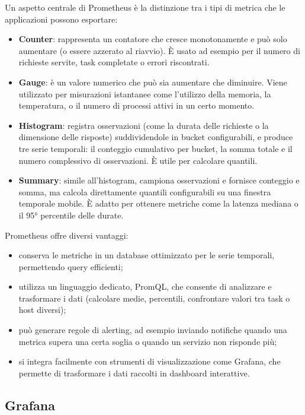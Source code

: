 Un aspetto centrale di Prometheus è la distinzione tra i tipi di metrica che le applicazioni possono esportare:

\begin{itemize}
    \item \textbf{Counter}: rappresenta un contatore che cresce monotonamente e può solo aumentare (o essere azzerato al riavvio). È usato ad esempio per il numero di richieste servite, task completate o errori riscontrati.
    \item \textbf{Gauge}: è un valore numerico che può sia aumentare che diminuire. Viene utilizzato per misurazioni istantanee come l’utilizzo della memoria, la temperatura, o il numero di processi attivi in un certo momento.
    \item \textbf{Histogram}: registra osservazioni (come la durata delle richieste o la dimensione delle risposte) suddividendole in bucket configurabili, e produce tre serie temporali: il conteggio cumulativo per bucket, la somma totale e il numero complessivo di osservazioni. È utile per calcolare quantili.
    \item \textbf{Summary}: simile all’histogram, campiona osservazioni e fornisce conteggio e somma, ma calcola direttamente quantili configurabili su una finestra temporale mobile. È adatto per ottenere metriche come la latenza mediana o il 95° percentile delle durate.
\end{itemize}

Prometheus offre diversi vantaggi:
\begin{itemize}
    \item conserva le metriche in un database ottimizzato per le serie temporali, permettendo query efficienti;
    \item utilizza un linguaggio dedicato, PromQL, che consente di analizzare e trasformare i dati (calcolare medie, percentili, confrontare valori tra task o host diversi);
    \item può generare regole di alerting, ad esempio inviando notifiche quando una metrica supera una certa soglia o quando un servizio non risponde più;
    \item si integra facilmente con strumenti di visualizzazione come Grafana, che permette di trasformare i dati raccolti in dashboard interattive.
\end{itemize}

\subsection{Grafana}
\label{sec:grafana}

